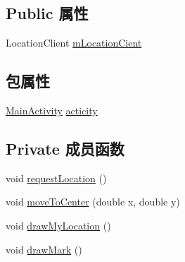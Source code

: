 \subsection*{Public 属性}
\begin{DoxyCompactItemize}
\item 
Location\+Client \mbox{\hyperlink{classcom_1_1example_1_1akisame__lin_1_1love__air2_1_1_map___fragment_a4cb0410976276d750a2f751ca13fc597}{m\+Location\+Cient}}
\end{DoxyCompactItemize}
\subsection*{包属性}
\begin{DoxyCompactItemize}
\item 
\mbox{\hyperlink{classcom_1_1example_1_1akisame__lin_1_1love__air2_1_1_main_activity}{Main\+Activity}} \mbox{\hyperlink{classcom_1_1example_1_1akisame__lin_1_1love__air2_1_1_map___fragment_a6683e86bc3155ac774d782ca25f18657}{acticity}}
\end{DoxyCompactItemize}
\subsection*{Private 成员函数}
\begin{DoxyCompactItemize}
\item 
void \mbox{\hyperlink{classcom_1_1example_1_1akisame__lin_1_1love__air2_1_1_map___fragment_af0646183fd5f985a58ff485ef6baa753}{request\+Location}} ()
\item 
void \mbox{\hyperlink{classcom_1_1example_1_1akisame__lin_1_1love__air2_1_1_map___fragment_a487bfff4a9aef1315ef1f97351ee2694}{move\+To\+Center}} (double x, double y)
\item 
void \mbox{\hyperlink{classcom_1_1example_1_1akisame__lin_1_1love__air2_1_1_map___fragment_a7c60cff07d4fb43a87d040bd2e2d82ba}{draw\+My\+Location}} ()
\item 
void \mbox{\hyperlink{classcom_1_1example_1_1akisame__lin_1_1love__air2_1_1_map___fragment_a027a603af0817d6d6a58491a001af6d5}{draw\+Mark}} ()
\end{DoxyCompactItemize}
